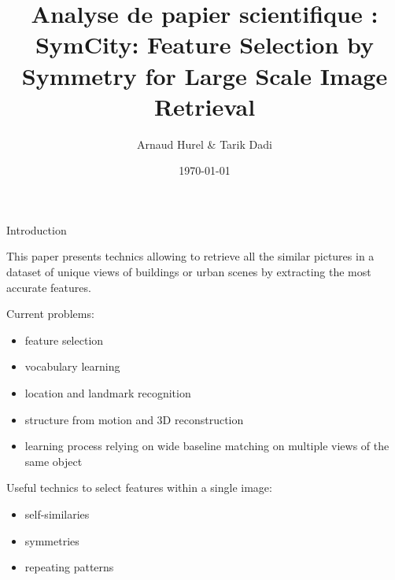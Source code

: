 \documentclass[11pt]{beamer}
\author{Arnaud Hurel \& Tarik Dadi}
\title[SymCity \hspace{25mm} \insertframenumber/\inserttotalframenumber]{Analyse de papier scientifique : \\SymCity: Feature Selection by Symmetry for Large Scale Image Retrieval}
\date{\today}
\begin{document}
\begin{frame}
\titlepage
\end{frame}

\begin{frame}{Introduction}

This paper presents technics allowing to retrieve all the similar pictures in a dataset of unique views of buildings or urban scenes by extracting the most accurate features.\newline

Current problems:
\begin{itemize}
\item feature selection
\item vocabulary learning
\item location and landmark recognition
\item structure from motion and 3D reconstruction
\item learning process relying on wide baseline matching on multiple views of the same object
\end{itemize}

Useful technics to select features within a single image:
\begin{itemize}
\item self-similaries
\item symmetries
\item repeating patterns
\end{itemize}
\end{frame}

\begin{frame}
\tableofcontents
\end{frame}
\end{document}
